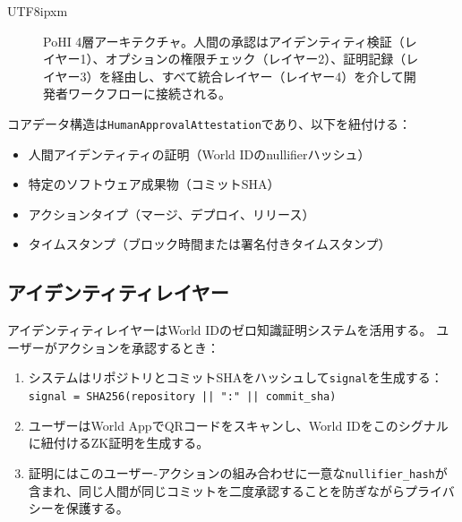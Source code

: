 \documentclass[a4paper,10pt]{article}
\begin{document}
\begin{CJK}{UTF8}{ipxm}
\begin{figure}[ht]
\caption{PoHI 4層アーキテクチャ。人間の承認はアイデンティティ検証（レイヤー1）、オプションの権限チェック（レイヤー2）、証明記録（レイヤー3）を経由し、すべて統合レイヤー（レイヤー4）を介して開発者ワークフローに接続される。}
\label{fig:architecture}
\end{figure}

コアデータ構造は\texttt{HumanApprovalAttestation}であり、以下を紐付ける：
\begin{itemize}
    \item 人間アイデンティティの証明（World IDのnullifierハッシュ）
    \item 特定のソフトウェア成果物（コミットSHA）
    \item アクションタイプ（マージ、デプロイ、リリース）
    \item タイムスタンプ（ブロック時間または署名付きタイムスタンプ）
\end{itemize}

\subsection{アイデンティティレイヤー}

アイデンティティレイヤーはWorld IDのゼロ知識証明システムを活用する。
ユーザーがアクションを承認するとき：

\begin{enumerate}
    \item システムはリポジトリとコミットSHAをハッシュして\texttt{signal}を生成する： \\ \texttt{signal = SHA256(repository || ":" || commit\_sha)}
    \item ユーザーはWorld AppでQRコードをスキャンし、World IDをこのシグナルに紐付けるZK証明を生成する。
    \item 証明にはこのユーザー-アクションの組み合わせに一意な\texttt{nullifier\_hash}が含まれ、同じ人間が同じコミットを二度承認することを防ぎながらプライバシーを保護する。
\end{enumerate}


\end{CJK}
\end{document}
